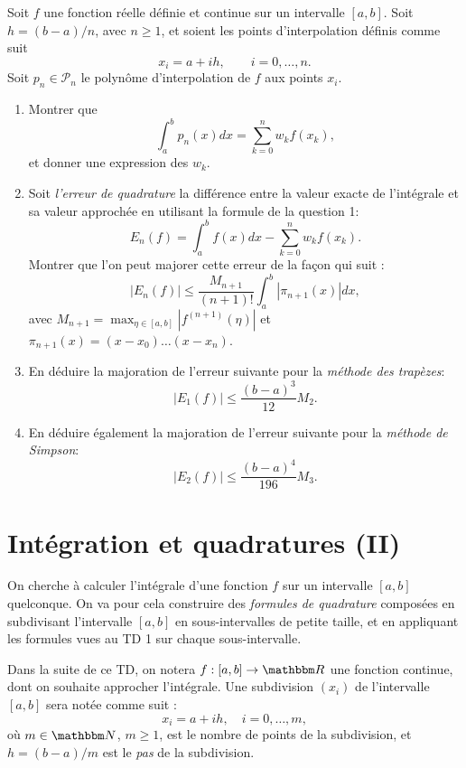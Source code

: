 \begin{exercice}

Soit $f$ une fonction réelle définie et continue sur un intervalle $[a,b]$. Soit $h=(b-a)/n$, avec $n\geq1$, et soient les points d'interpolation définis comme suit
\[
x_i = a + i h, \qquad i=0,\ldots,n.
\]
Soit $p_n \in \mathcal{P}_n$ le polynôme d'interpolation de $f$ aux points $x_i$.

\begin{enumerate}

\item Montrer que
\[
 \int_a^b p_n(x) dx = \sum_{k=0}^n w_k f(x_k),
\]
et donner une expression des $w_k$.

\item Soit \emph{l'erreur de quadrature} la différence entre la valeur exacte de l'intégrale et sa valeur approchée en utilisant la formule de la question 1:
\[
E_n (f) = \int_a^b f(x) dx - \sum_{k=0}^n w_k f(x_k).
\]
Montrer que l'on peut majorer cette erreur de la façon qui suit :
\[
| E_n (f) | \leq \frac{M_{n+1}}{(n+1)!} \int_a^b | \pi_{n+1} (x)| dx,
\]
avec
$M_{n+1} = \max_{\eta \in [a,b]} | f^{(n+1)} (\eta) |$
et
$\pi_{n+1}(x) = ( x - x_0 ) \ldots (x - x_n)$.

\item En déduire la majoration de l'erreur suivante pour la \emph{méthode des trapèzes}:
\[
| E_1 (f) | \leq \frac{(b-a)^3}{12} M_2.
\]

\item En déduire également la majoration de l'erreur suivante pour la \emph{méthode de Simpson}:
\[
| E_2 (f) | \leq \frac{(b-a)^4}{196} M_3.
\]


\end{enumerate}

\end{exercice}

\newpage

\section{Intégration et quadratures (II)}

On cherche à calculer l'intégrale d'une fonction $f$ sur un intervalle $[a,b]$ quelconque. On va pour cela construire des \emph{formules de quadrature} composées en subdivisant l'intervalle $[a,b]$ en sous-intervalles de petite taille, et en appliquant les formules vues au TD 1 sur chaque sous-intervalle.

Dans la suite de ce TD, on notera $f: [a,b] \rightarrow \eR$ une fonction continue, dont on souhaite approcher l'intégrale. Une subdivision $(x_i)$ de l'intervalle $[a,b]$ sera notée comme suit :
\[
x_i = a + i h, \quad i=0,\ldots,m,
\]
où $m \in \eN$, $m\geq1$, est le nombre de points de la subdivision, et $h = (b-a)/m$ est le \emph{pas} de la subdivision.

